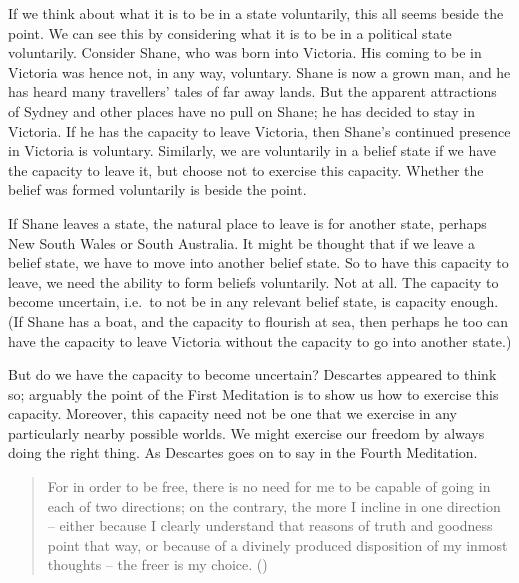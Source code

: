 \documentclass[
  10pt,
  letterpaper,
  DIV=11,
  numbers=noendperiod,
  twoside]{scrartcl}
\begin{document}
If we think about what it is to be in a state voluntarily, this all
seems beside the point. We can see this by considering what it is to be
in a political state voluntarily. Consider Shane, who was born into
Victoria. His coming to be in Victoria was hence not, in any way,
voluntary. Shane is now a grown man, and he has heard many travellers'
tales of far away lands. But the apparent attractions of Sydney and
other places have no pull on Shane; he has decided to stay in Victoria.
If he has the capacity to leave Victoria, then Shane's continued
presence in Victoria is voluntary. Similarly, we are voluntarily in a
belief state if we have the capacity to leave it, but choose not to
exercise this capacity. Whether the belief was formed voluntarily is
beside the point.

If Shane leaves a state, the natural place to leave is for another
state, perhaps New South Wales or South Australia. It might be thought
that if we leave a belief state, we have to move into another belief
state. So to have this capacity to leave, we need the ability to form
beliefs voluntarily. Not at all. The capacity to become uncertain,
i.e.~to not be in any relevant belief state, is capacity enough. (If
Shane has a boat, and the capacity to flourish at sea, then perhaps he
too can have the capacity to leave Victoria without the capacity to go
into another state.)

But do we have the capacity to become uncertain? Descartes appeared to
think so; arguably the point of the First Meditation is to show us how
to exercise this capacity. Moreover, this capacity need not be one that
we exercise in any particularly nearby possible worlds. We might
exercise our freedom by always doing the right thing. As Descartes goes
on to say in the Fourth Meditation.

\begin{quote}
For in order to be free, there is no need for me to be capable of going
in each of two directions; on the contrary, the more I incline in one
direction -- either because I clearly understand that reasons of truth
and goodness point that way, or because of a divinely produced
disposition of my inmost thoughts -- the freer is my choice.
()
\end{quote}
\end{document}
